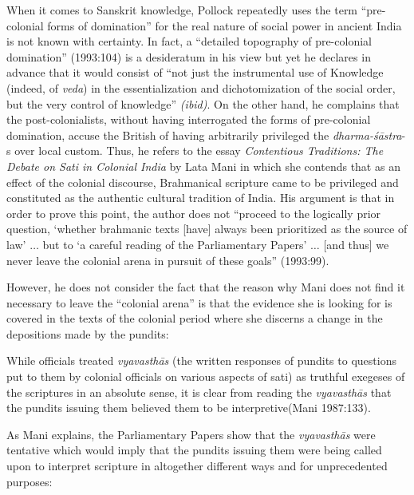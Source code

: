 When it comes to Sanskrit knowledge, Pollock repeatedly uses the term “pre-colonial forms of domination” for the real nature of social power in ancient India is not known with certainty. In fact, a “detailed topography of pre-colonial domination” (1993:104) is a desideratum in his view but yet he declares in advance that it would consist of “not just the instrumental use of Knowledge (indeed, of {\sl veda}) in the essentialization and dichotomization of the social order, but the very control of knowledge” {\sl (ibid)}. On the other hand, he complains that the post-colonialists, without having interrogated the forms of pre-colonial domination, accuse the British of having arbitrarily privileged the {\sl dharma-śāstra}-s over local custom. Thus, he refers to the essay {\sl Contentious Traditions: The Debate on Sati in Colonial India} by Lata Mani in which she contends that as an effect of the colonial discourse, Brahmanical scripture came to be privileged and constituted as the authentic cultural tradition of India. His argument is that in order to prove this point, the author does not “proceed to the logically prior question, ‘whether brahmanic texts [have] always been prioritized as the source of law’ $\ldots$ but to ‘a careful reading of the Parliamentary Papers’ $\ldots$ [and thus] we never leave the colonial arena in pursuit of these goals” (1993:99).

However, he does not consider the fact that the reason why Mani does not find it necessary to leave the “colonial arena” is that the evidence she is looking for is covered in the texts of the colonial period where she discerns a change in the depositions made by the pundits:
\begin{myquote}
While officials treated {\sl vyavasthās} (the written responses of pundits to questions put to them by colonial officials on various aspects of sati) as truthful exegeses of the scriptures in an absolute sense, it is clear from reading the {\sl vyavasthās} that the pundits issuing them believed them to be interpretive\hfill (Mani 1987:133).
\end{myquote}

As Mani explains, the Parliamentary Papers show that the {\sl vyavasthās} were tentative which would imply that the pundits issuing them were being called upon to interpret scripture in altogether different ways and for unprecedented purposes: 

